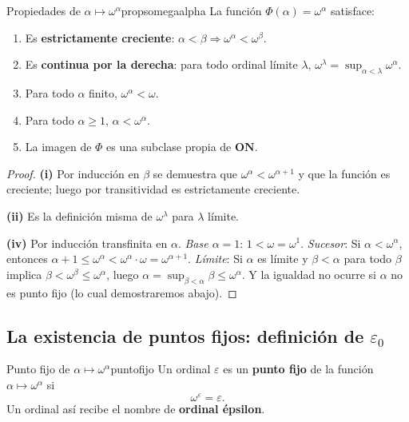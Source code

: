 \begin{proposicion}{Propiedades de $\alpha \mapsto \omega^\alpha$}{propsomegaalpha}
La función $\Phi(\alpha) = \omega^\alpha$ satisface:
\begin{enumerate}[leftmargin=2em, label=(\roman*)]
  \item Es \textbf{estrictamente creciente}: $\alpha < \beta \Rightarrow \omega^\alpha < \omega^\beta$.
  \item Es \textbf{continua por la derecha}: para todo ordinal límite $\lambda$, $\omega^\lambda = \sup_{\alpha < \lambda} \omega^\alpha$.
  \item Para todo $\alpha$ finito, $\omega^\alpha < \omega$.
  \item Para todo $\alpha \geq 1$, $\alpha < \omega^\alpha$.
  \item La imagen de $\Phi$ es una subclase propia de $\mathbf{ON}$.
\end{enumerate}
\end{proposicion}

\begin{proof}
\textbf{(i)} Por inducción en $\beta$ se demuestra que $\omega^\alpha < \omega^{\alpha+1}$ y que la función es creciente; luego por transitividad es estrictamente creciente.

\textbf{(ii)} Es la definición misma de $\omega^\lambda$ para $\lambda$ límite.

\textbf{(iv)} Por inducción transfinita en $\alpha$.
\textit{Base $\alpha=1$}: $1 < \omega = \omega^1$. \checkmark
\textit{Sucesor}: Si $\alpha < \omega^\alpha$, entonces $\alpha + 1 \leq \omega^\alpha < \omega^\alpha \cdot \omega = \omega^{\alpha+1}$. \checkmark
\textit{Límite}: Si $\alpha$ es límite y $\beta < \alpha$ para todo $\beta$ implica $\beta < \omega^\beta \leq \omega^\alpha$, luego $\alpha = \sup_{\beta < \alpha} \beta \leq \omega^\alpha$. Y la igualdad no ocurre si $\alpha$ no es punto fijo (lo cual demostraremos abajo). \checkmark
\end{proof}

\subsection{La existencia de puntos fijos: definición de $\varepsilon_0$}

\begin{definicion}{Punto fijo de $\alpha \mapsto \omega^\alpha$}{puntofijo}
Un ordinal $\varepsilon$ es un \textbf{punto fijo} de la función $\alpha \mapsto \omega^\alpha$ si
\[
  \omega^\varepsilon = \varepsilon.
\]
Un ordinal así recibe el nombre de \textbf{ordinal épsilon}.
\end{definicion}

